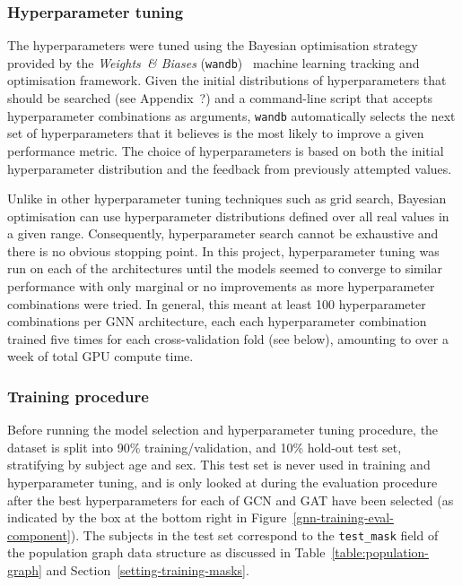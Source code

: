 \subsubsection{Hyperparameter tuning}
The hyperparameters were tuned using the Bayesian optimisation strategy provided by the \textit{Weights~\& Biases} (\texttt{wandb})~\cite{wandb} machine learning tracking and optimisation framework. Given the initial distributions of hyperparameters that should be searched (see Appendix~?) and a command-line script that accepts hyperparameter combinations as arguments, \texttt{wandb} automatically selects the next set of hyperparameters that it believes is the most likely to improve a given performance metric. The choice of hyperparameters is based on both the initial hyperparameter distribution and the feedback from previously attempted values.

Unlike in other hyperparameter tuning techniques such as grid search, Bayesian optimisation can use hyperparameter distributions defined over all real values in a given range. Consequently, hyperparameter search cannot be exhaustive and there is no obvious stopping point. In this project, hyperparameter tuning was run on each of the architectures until the models seemed to converge to similar performance with only marginal or no improvements as more hyperparameter combinations were tried. In general, this meant at least 100 hyperparameter combinations per GNN architecture, each each hyperparameter combination trained five times for each cross-validation fold (see below), amounting to over a week of total GPU compute time.

\subsubsection{Training procedure}

Before running the model selection and hyperparameter tuning procedure, the dataset is split into 90\% training/validation, and 10\% hold-out test set, stratifying by subject age and sex. This test set is never used in training and hyperparameter tuning, and is only looked at during the evaluation procedure after the best hyperparameters for each of GCN and GAT have been selected (as indicated by the box at the bottom right in Figure~\ref{gnn-training-eval-component}). The subjects in the test set correspond to the \texttt{test\_mask} field of the population graph data structure as discussed in Table~\ref{table:population-graph} and Section~\ref{setting-training-masks}. 

